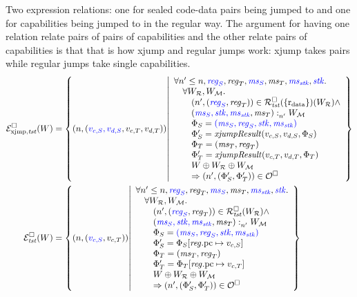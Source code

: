 \documentclass[a4paper]{article}
\begin{document}
Two expression relations: one for sealed code-data pairs being jumped to and one for capabilities being jumped to in the regular way.
The argument for having one relation relate pairs of pairs of capabilities and the other relate pairs of capabilities is that that is how xjump and regular jumps work: xjump takes pairs while regular jumps take single capabilities.
\begin{align*}
  \lrexjg{\trust}(W) &= \left\{ \npair{\stpair[.]{v_{c,S},v_{d,S}}{v_{c,T},v_{d,T}}} \middle| 
    \begin{array}{l}
      \forall n' \leq n, \src{\reg_S}, \reg_T, \src{\ms_S}, \ms_T, \src{\ms_\stk}, \src{\stk} \ldotp\\
      \quad \forall W_\lrrs , W_\lrm \ldotp \\
      \qquad\npair[n']{\stpair{\reg}{\reg}} \in \lrrg{\trust}(\{\rdata\}) (W_\lrrs ) \wedge\\
      \qquad\memSat[n']{\stpair[.]{\ms_S,\stk,\ms_\stk}{\ms_T}}{W_\lrm} \\
      \qquad\Phi_S = \src{(\ms_S,\reg_S,\stk, \ms_\stk)}\\
      \qquad \Phi_S' = \xjumpResult{v_{c,S}}{v_{d,S}}{\Phi_S}\\
      \qquad\Phi_T = (\ms_T,\reg_T)\\
      \qquad\Phi_T' = \xjumpResult{v_{c,T}}{v_{d,T}}{\Phi_T}\\
      \qquad W \oplus W_\lrrs \oplus W_\lrm \\
      \qquad\Rightarrow\npair[n']{\left(\Phi_S', \Phi_T' \right)}\in \lro
    \end{array}
    \right\}\\
  \lreg{\trust}(W) &= \left\{ \npair{\stpair[.]{v_{c,S}}{v_{c,T}}} \middle| 
    \begin{array}{l}
      \forall n' \leq n, \src{\reg_S}, \reg_T, \src{\ms_S}, \ms_T, \src{\ms_\stk}, \src{\stk} \ldotp\\
      \quad \forall W_\lrrs , W_\lrm \ldotp \\
      \qquad\npair[n']{\stpair{\reg}{\reg}} \in \lrrg{\trust} (W_\lrrs ) \wedge\\
      \qquad\memSat[n']{\stpair[.]{\ms_S,\stk,\ms_\stk}{\ms_T}}{W_\lrm} \\
      \qquad\Phi_S = \src{(\ms_S,\reg_S,\stk, \ms_\stk)}\\
      \qquad \Phi_S' = \Phi_S \updReg{\pcreg}{v_{c,S}}\\
      \qquad\Phi_T = (\ms_T,\reg_T)\\
      \qquad\Phi_T' = \Phi_T\updReg{\pcreg}{v_{c,T}}\\
      \qquad W \oplus W_\lrrs \oplus W_\lrm\\
      \qquad\Rightarrow\npair[n']{\left(\Phi_S', \Phi_T' \right)}\in \lro
    \end{array}
    \right\}
\end{align*}
 
\end{document}
